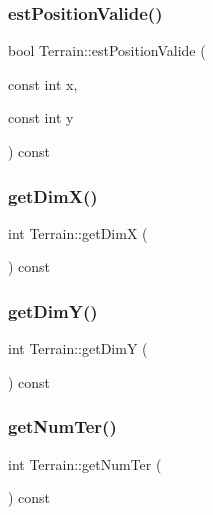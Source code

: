 \mbox{\label{class_terrain_a939a702645ade7ce599f55c1b760cb26}} 
\subsubsection{\texorpdfstring{est\+Position\+Valide()}{estPositionValide()}}
{\footnotesize\ttfamily bool Terrain\+::est\+Position\+Valide (\begin{DoxyParamCaption}\item[{const int}]{x,  }\item[{const int}]{y }\end{DoxyParamCaption}) const}

\mbox{\label{class_terrain_accb6cc4ab37641b10d6d0cc3c2d9b0cb}} 
\subsubsection{\texorpdfstring{get\+Dim\+X()}{getDimX()}}
{\footnotesize\ttfamily int Terrain\+::get\+DimX (\begin{DoxyParamCaption}{ }\end{DoxyParamCaption}) const}

\mbox{\label{class_terrain_a60bc76d822c15ca30576bd747d156b48}} 
\subsubsection{\texorpdfstring{get\+Dim\+Y()}{getDimY()}}
{\footnotesize\ttfamily int Terrain\+::get\+DimY (\begin{DoxyParamCaption}{ }\end{DoxyParamCaption}) const}

\mbox{\label{class_terrain_a4e44d60542cfb60119468af5d24b69cd}} 
\subsubsection{\texorpdfstring{get\+Num\+Ter()}{getNumTer()}}
{\footnotesize\ttfamily int Terrain\+::get\+Num\+Ter (\begin{DoxyParamCaption}{ }\end{DoxyParamCaption}) const}


